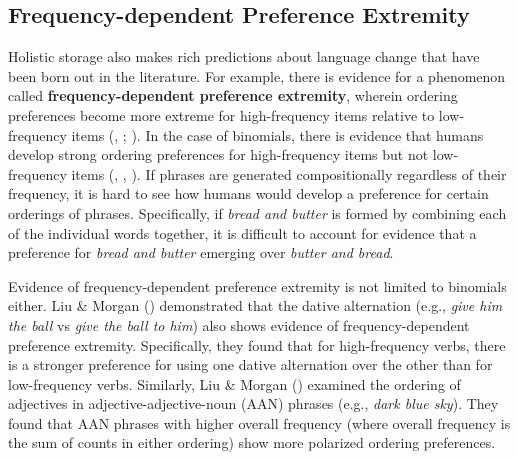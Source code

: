 \documentclass[
  12pt,
]{scrartcl}
\begin{document}
\subsection{Frequency-dependent Preference
Extremity}\label{frequency-dependent-preference-extremity}

Holistic storage also makes rich predictions about language change that
have been born out in the literature. For example, there is evidence for
a phenomenon called \textbf{frequency-dependent preference extremity},
wherein ordering preferences become more extreme for high-frequency
items relative to low-frequency items
(,
;
). In the case of binomials, there is evidence that humans develop
strong ordering preferences for high-frequency items but not
low-frequency items
(, ,
).
If phrases are generated compositionally regardless of their frequency,
it is hard to see how humans would develop a preference for certain
orderings of phrases. Specifically, if \emph{bread and butter} is formed
by combining each of the individual words together, it is difficult to
account for evidence that a preference for \emph{bread and butter}
emerging over \emph{butter and bread}.

Evidence of frequency-dependent preference extremity is not limited to
binomials either. Liu \& Morgan
()
demonstrated that the dative alternation (e.g., \emph{give him the ball}
vs \emph{give the ball to him}) also shows evidence of
frequency-dependent preference extremity. Specifically, they found that
for high-frequency verbs, there is a stronger preference for using one
dative alternation over the other than for low-frequency verbs.
Similarly, Liu \& Morgan
()
examined the ordering of adjectives in adjective-adjective-noun (AAN)
phrases (e.g., \emph{dark blue sky}). They found that AAN phrases with
higher overall frequency (where overall frequency is the sum of counts
in either ordering) show more polarized ordering preferences.
\end{document}
